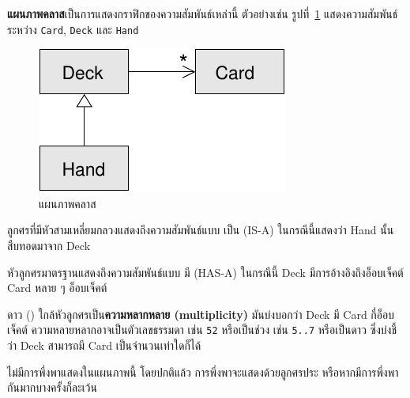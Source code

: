 {\bf แผนภาพคลาส}เป็นการแสดงกราฟิกของความสัมพันธ์เหล่านี้ ตัวอย่างเช่น รูปที่~\ref{fig.class1} 
แสดงความสัมพันธ์ระหว่าง {\tt Card}, {\tt Deck} และ {\tt Hand}

\begin{figure}
\centerline
{\includegraphics[scale=0.8]{figs/class1.pdf}}
\caption{แผนภาพคลาส}
\label{fig.class1}
\end{figure}


ลูกศรที่มีหัวสามเหลี่ยมกลวงแสดงถึงความสัมพันธ์แบบ เป็น (IS-A) ในกรณีนี้แสดงว่า Hand นั้นสืบทอดมาจาก Deck


หัวลูกศรมาตรฐานแสดงถึงความสัมพันธ์แบบ มี (HAS-A) ในกรณีนี้ Deck มีการอ้างอิงถึงอ็อบเจ็คต์ Card หลาย ๆ อ็อบเจ็คต์


ดาว ({\tt *}) ใกล้หัวลูกศรเป็น{\bf ความหลากหลาย (multiplicity)} มันบ่งบอกว่า Deck มี Card กี่อ็อบเจ็คต์
ความหลายหลากอาจเป็นตัวเลขธรรมดา เช่น {\tt 52} หรือเป็นช่วง เช่น {\tt 5..7} หรือเป็นดาว ซึ่งบ่งชี้ว่า Deck สามารถมี Card เป็นจำนวนเท่าใดก็ได้


ไม่มีการพึ่งพาแสดงในแผนภาพนี้ โดยปกติแล้ว การพึ่งพาจะแสดงด้วยลูกศรประ หรือหากมีการพึ่งพากันมากบางครั้งก็ละเว้น 


